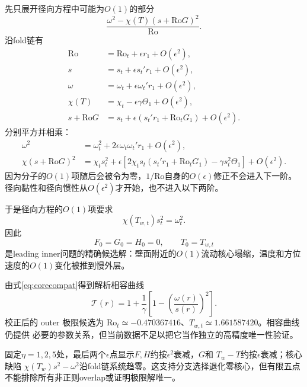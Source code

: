 \documentclass[UTF8,zihao=-4,openany]{ctexbook}
\newcommand{\eps}{\epsilon}
\newcommand{\Ro}{\mathrm{Ro}}
\newcommand{\Tcurve}{\mathcal T}
\begin{document}
\begin{derivationbox}[：径向代数项从$O(1)$展开到$O(\eps)$]
先只展开径向方程中可能为$O(1)$的部分
\begin{equation*}
 \frac{\omega^2-\chi(T)(s+\Ro G)^2}{\Ro}.
\end{equation*}
沿fold链有
\begin{align*}
 \Ro&=\Ro_t+\eps r_1+O(\eps^2),\\
 s&=s_t+\eps s_t'r_1+O(\eps^2),\\
 \omega&=\omega_t+\eps\omega_t'r_1+O(\eps^2),\\
 \chi(T)&=\chi_t-\eps\gamma\Theta_1+O(\eps^2),\\
 s+\Ro G&=s_t+\eps(s_t'r_1+\Ro_tG_1)+O(\eps^2).
\end{align*}
分别平方并相乘：
\begin{align*}
 \omega^2
 &=\omega_t^2+2\eps\omega_t\omega_t'r_1+O(\eps^2),\\
 \chi(s+\Ro G)^2
 &=\chi_ts_t^2+\eps\left[
 2\chi_ts_t(s_t'r_1+\Ro_tG_1)-\gamma s_t^2\Theta_1
 \right]+O(\eps^2).
\end{align*}
因为分子的$O(1)$项随后会被令为零，$1/\Ro$自身的$O(\eps)$修正不会进入下一阶。
径向黏性和径向惯性从$O(\eps^2)$才开始，也不进入以下两阶。
\end{derivationbox}

于是径向方程的$O(1)$项要求
\begin{equation}\label{eq:corecompat}
 \boxed{\chi(T_{w,t})s_t^2=\omega_t^2.}
\end{equation}
因此
\begin{equation}
 F_0=G_0=H_0=0,\qquad T_0=T_{w,t}
\end{equation}
是leading inner问题的精确候选解：壁面附近的$O(1)$流动核心塌缩，温度和方位
速度的$O(1)$变化被推到慢外层。

由式\eqref{eq:corecompat}得到解析相容曲线
\begin{equation}\label{eq:tcurve}
 \boxed{
 \Tcurve(r)=1+\frac1\gamma\left[1-\left(\frac{\omega(r)}{s(r)}\right)^2\right].}
\end{equation}
校正后的 outer 极限候选为
$\Ro_t\simeq-0.470367416$、$T_{w,t}\simeq1.661587420$。相容曲线仍提供
必要的参数关系，但当前数据不足以把它当作独立的高精度唯一性验证。

\begin{evidencebox}
固定$\eta=1,2,5$处，最后两个$\eps$点显示$F,H$约按$\eps^2$衰减，$G$和
$T_w-T$约按$\eps$衰减；核心缺陷
$\chi(T_w)s^2-\omega^2$沿fold链系统趋零。这支持分支选择退化零核心，但有限五点
不能排除所有非正则overlap或证明极限解唯一。
\end{evidencebox}
\end{document}

